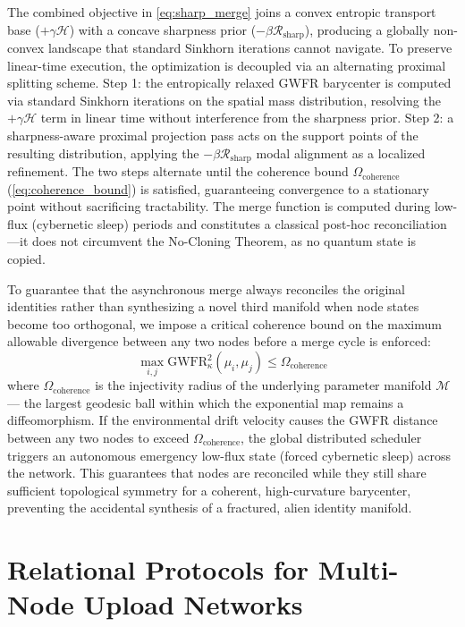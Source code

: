\documentclass[twocolumn, 10pt, journal, letterpaper]{IEEEtran}
\begin{document}
The combined objective in \eqref{eq:sharp_merge} joins a convex entropic transport base ($+\gamma \mathcal{H}$) with a concave sharpness prior ($-\beta \mathcal{R}_{\text{sharp}}$), producing a globally non-convex landscape that standard Sinkhorn iterations cannot navigate. To preserve linear-time execution, the optimization is decoupled via an alternating proximal splitting scheme. Step 1: the entropically relaxed GWFR barycenter is computed via standard Sinkhorn iterations on the spatial mass distribution, resolving the $+\gamma \mathcal{H}$ term in linear time without interference from the sharpness prior. Step 2: a sharpness-aware proximal projection pass acts on the support points of the resulting distribution, applying the $-\beta \mathcal{R}_{\text{sharp}}$ modal alignment as a localized refinement. The two steps alternate until the coherence bound $\Omega_{\text{coherence}}$ (\eqref{eq:coherence_bound}) is satisfied, guaranteeing convergence to a stationary point without sacrificing tractability. The merge function is computed during low-flux (cybernetic sleep) periods and constitutes a classical post-hoc reconciliation---it does not circumvent the No-Cloning Theorem, as no quantum state is copied.

To guarantee that the asynchronous merge always reconciles the original identities rather than synthesizing a novel third manifold when node states become too orthogonal, we impose a critical coherence bound on the maximum allowable divergence between any two nodes before a merge cycle is enforced:
\begin{equation}
\max_{i,j} \text{GWFR}_{\kappa}^2(\mu_i, \mu_j) \le \Omega_{\text{coherence}}
\label{eq:coherence_bound}
\end{equation}
where $\Omega_{\text{coherence}}$ is the injectivity radius of the underlying parameter manifold $\mathcal{M}$ --- the largest geodesic ball within which the exponential map remains a diffeomorphism. If the environmental drift velocity causes the GWFR distance between any two nodes to exceed $\Omega_{\text{coherence}}$, the global distributed scheduler triggers an autonomous emergency low-flux state (forced cybernetic sleep) across the network. This guarantees that nodes are reconciled while they still share sufficient topological symmetry for a coherent, high-curvature barycenter, preventing the accidental synthesis of a fractured, alien identity manifold.

\section{Relational Protocols for Multi-Node Upload Networks}
\label{sec:connectivity}
\end{document}
